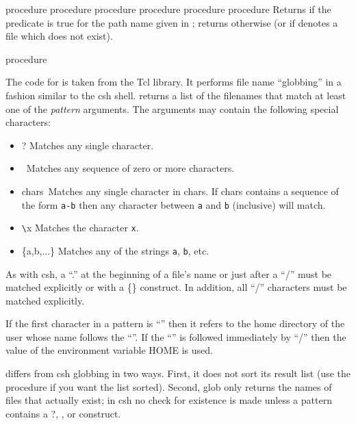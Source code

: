 \begin{entry}{%
 {procedure}
 {procedure}
 {procedure}
 {procedure}
 {procedure}
 {procedure}}
\saut
Returns {\schtrue} if the predicate is true for the path name given in
; returns {\schfalse} otherwise (or if  denotes a file
which does not exist).
\end{entry}

\begin{entry}{%
 {procedure}}
\saut


The code for  is taken from the Tcl library. It performs
file name ``globbing'' in a fashion similar to the csh shell.
 returns a list of the filenames that match at least one of
the {\em pattern} arguments.  The  arguments may contain
the following special characters:

\begin{itemize}
\item ? Matches any single character.
\item \etoile~Matches any sequence of zero or more characters.
\item {\leftbracket}chars\rightbracket~Matches any single character in chars. 
      If chars contains a sequence of the form {\tt a-b} then any character between
       {\tt a} and {\tt b} (inclusive) will match.
\item  \verb+\+x  Matches the character {\tt x}.
\item \{a,b,...\} Matches any of the strings {\tt a}, {\tt b}, etc.
\end{itemize}

As with csh, a ``.'' at the beginning of a file's name or just after a ``/''
must be matched explicitly or with a \{\} construct.  In addition, all ``/''
characters must be matched explicitly.

If the first character in a pattern is ``{\tilda}'' then it refers to
the home directory of the user whose name follows the ``{\tilda}''.
If the ``{\tilda}'' is followed immediately by ``/'' then the value of
the environment variable HOME is used.

 differs from csh globbing in two ways.  First, it does not
sort its result list (use the  procedure if you want the list sorted).
Second, glob only returns the names of files that actually exist; in csh no
check for existence is made unless a pattern contains a ?, \etoile, or  
\leftbracket\rightbracket
construct.
\end{entry}

